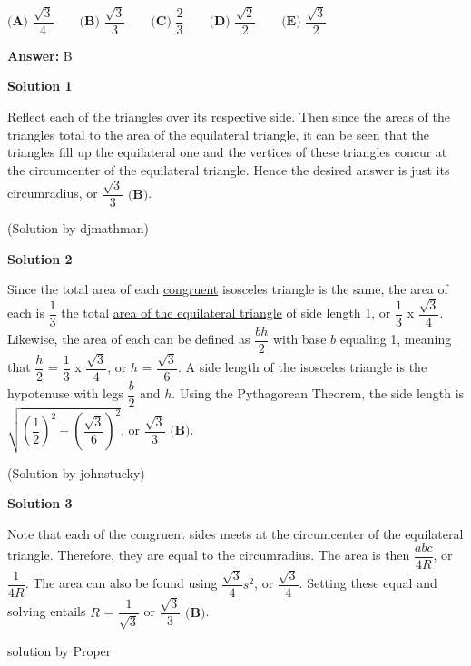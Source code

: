 \begin{enumerate}
 $\textbf{(A) }\dfrac{\sqrt3}4\qquad \textbf{(B) }\dfrac{\sqrt3}3\qquad \textbf{(C) }\dfrac23\qquad \textbf{(D) }\dfrac{\sqrt2}2\qquad \textbf{(E) }\dfrac{\sqrt3}2$

 \textbf{Answer: }B



\textbf{Solution 1}

Reflect each of the triangles over its respective side.  Then since the areas of the triangles total to the area of the equilateral triangle, it can be seen that the triangles fill up the equilateral one and the vertices of these triangles concur at the circumcenter of the equilateral triangle.  Hence the desired answer is just its circumradius, or $\boxed{\dfrac{\sqrt3}3\textbf{ (B)}}$.

 (Solution by djmathman)

 



\textbf{Solution 2}

Since the total area of each \href{https://artofproblemsolving.com/wiki/index.php?title=Congruent\_(geometry)}{congruent} isosceles triangle is the same, the area of each is $\dfrac{1}3$ the total \href{https://artofproblemsolving.com/wiki/index.php?title=Area\_of\_an\_equilateral\_triangle}{area of the equilateral triangle} of side length 1, or $\dfrac{1}3$ x $\dfrac{\sqrt3}4$. Likewise, the area of each can be defined as $\dfrac{bh}2$ with base $b$ equaling 1, meaning that $\dfrac{h}2$ = $\dfrac{1}3$ x $\dfrac{\sqrt3}4$, or $h$ = $\dfrac{\sqrt3}6$. A side length of the isosceles triangle is the hypotenuse with legs $\dfrac{b}2$ and $h$. Using the Pythagorean Theorem, the side length is $\sqrt{{(\dfrac{1}2)}^2 + {(\dfrac{\sqrt3}6)}^2}$, or $\boxed{\dfrac{\sqrt3}3\textbf{ (B)}}$.

 (Solution by johnstucky)

 



\textbf{Solution 3}

Note that each of the congruent sides meets at the circumcenter of the equilateral triangle. Therefore, they are equal to the circumradius. The area is then $\dfrac{abc}{4R}$, or $\dfrac{1}{4R}$. The area can also be found using $\dfrac{\sqrt3}{4}s^2$, or $\dfrac{\sqrt3}{4}$. Setting these equal and solving entails $R$ = $\dfrac{1}{\sqrt3}$ or $\boxed{\dfrac{\sqrt3}3\textbf{ (B)}}$.

 solution by Proper

 



\end{enumerate}

